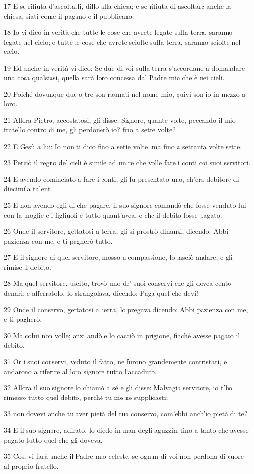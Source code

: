 \par 17 E se rifiuta d'ascoltarli, dillo alla chiesa; e se rifiuta di ascoltare anche la chiesa, siati come il pagano e il pubblicano.
\par 18 Io vi dico in verità che tutte le cose che avrete legate sulla terra, saranno legate nel cielo; e tutte le cose che avrete sciolte sulla terra, saranno sciolte nel cielo.
\par 19 Ed anche in verità vi dico: Se due di voi sulla terra s'accordano a domandare una cosa qualsiasi, quella sarà loro concessa dal Padre mio che è nei cieli.
\par 20 Poiché dovunque due o tre son raunati nel nome mio, quivi son io in mezzo a loro.
\par 21 Allora Pietro, accostatosi, gli disse: Signore, quante volte, peccando il mio fratello contro di me, gli perdonerò io? fino a sette volte?
\par 22 E Gesù a lui: Io non ti dico fino a sette volte, ma fino a settanta volte sette.
\par 23 Perciò il regno de' cieli è simile ad un re che volle fare i conti coi suoi servitori.
\par 24 E avendo cominciato a fare i conti, gli fu presentato uno, ch'era debitore di diecimila talenti.
\par 25 E non avendo egli di che pagare, il suo signore comandò che fosse venduto lui con la moglie e i figliuoli e tutto quant'avea, e che il debito fosse pagato.
\par 26 Onde il servitore, gettatosi a terra, gli si prostrò dinanzi, dicendo: Abbi pazienza con me, e ti pagherò tutto.
\par 27 E il signore di quel servitore, mosso a compassione, lo lasciò andare, e gli rimise il debito.
\par 28 Ma quel servitore, uscito, trovò uno de' suoi conservi che gli dovea cento denari; e afferratolo, lo strangolava, dicendo: Paga quel che devi!
\par 29 Onde il conservo, gettatosi a terra, lo pregava dicendo: Abbi pazienza con me, e ti pagherò.
\par 30 Ma colui non volle; anzi andò e lo cacciò in prigione, finché avesse pagato il debito.
\par 31 Or i suoi conservi, veduto il fatto, ne furono grandemente contristati, e andarono a riferire al loro signore tutto l'accaduto.
\par 32 Allora il suo signore lo chiamò a sé e gli disse: Malvagio servitore, io t'ho rimesso tutto quel debito, perché tu me ne supplicasti;
\par 33 non dovevi anche tu aver pietà del tuo conservo, com'ebbi anch'io pietà di te?
\par 34 E il suo signore, adirato, lo diede in man degli aguzzini fino a tanto che avesse pagato tutto quel che gli doveva.
\par 35 Così vi farà anche il Padre mio celeste, se ognun di voi non perdona di cuore al proprio fratello.

